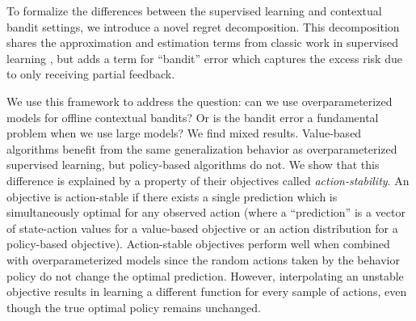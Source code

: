 To formalize the differences between the supervised learning and contextual bandit settings, we introduce a novel regret decomposition.
This decomposition shares the approximation and estimation terms from classic work in supervised learning \citep{vapnik1982, bottou2008tradeoffs}, but adds a term for ``bandit'' error which captures the excess risk due to only receiving partial feedback.


We use this framework to address the question: can we use overparameterized models for offline contextual bandits? Or is the bandit error a fundamental problem when we use large models?
We find mixed results.
Value-based algorithms benefit from the same generalization behavior as overparameterized supervised learning, but policy-based algorithms do not.
We show that this difference is explained by a property of their objectives called \emph{action-stability}.
An objective is action-stable if there exists a single prediction which is simultaneously optimal for any observed action (where a ``prediction'' is a vector of state-action values for a value-based objective or an action distribution for a policy-based objective).
Action-stable objectives perform well when combined with overparameterized models since the random actions taken by the behavior policy do not change the optimal prediction.
However, interpolating an unstable objective results in learning a different function for every sample of actions, even though the true optimal policy remains unchanged.




